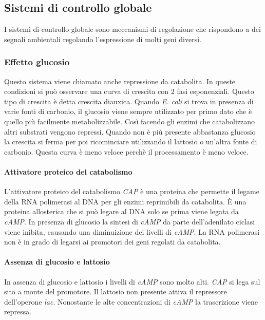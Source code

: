 	\subsection{Sistemi di controllo globale}
	I sistemi di controllo globale sono meccanismi di regolazione che rispondono a dei segnali ambientali regolando l'espressione di molti geni diversi. 

		\subsubsection{Effetto glucosio}
		Questo sistema viene chiamato anche repressione da catabolita.
		In queste condizioni si può osservare una curva di crescita con $2$ fasi esponenziali. 
		Questo tipo di crescita è detta crescita diauxica. 
		Quando \textit{E. coli} si trova in presenza di varie fonti di carbonio, il glucosio viene sempre utilizzato per primo dato che è quello pi\`u facilmente metabolizzabile. 
		Così facendo gli enzimi che catabolizzano altri substrati vengono repressi. 
		Quando non è più presente abbastanza glucosio la crescita si ferma per poi ricominciare utilizzando il lattosio o un'altra fonte di carbonio. 
		Questa curva è meno veloce perchè il processamento è meno veloce. 
		
			\paragraph{Attivatore proteico del catabolismo}
			L'attivatore proteico del catabolismo \emph{CAP} \`e una proteina che permette il legame della RNA polimerasi al DNA per gli enzimi reprimibili da catabolita.
			\`E una proteina allosterica che si pu\`o legare al DNA solo se prima viene legata da \emph{cAMP}.
			In presenza di glucosio la sintesi di \emph{cAMP} da parte dell'adenilato ciclasi viene inibita, causando una diminuizione dei livelli di \emph{cAMP}.
			La RNA polimerasi non \`e in grado di legarsi ai promotori dei geni regolati da catabolita.

			\paragraph{Assenza di glucosio e lattosio}
			In assenza di glucosio e lattosio i livelli di \emph{cAMP} sono molto alti.
			\emph{CAP} si lega sul sito a monte del promotore.
			Il lattosio non presente attiva il repressore dell'operone \emph{lac}.
			Nonostante le alte concentrazioni di \emph{cAMP} la trascrizione viene repressa.

